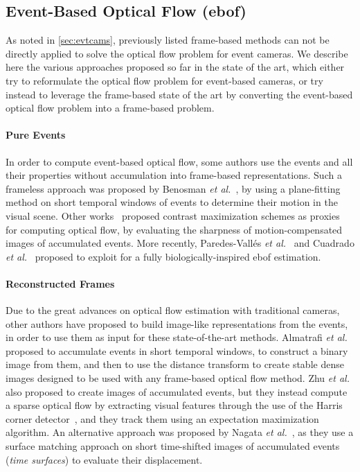 \subsection[Event-Based Optical Flow]{Event-Based Optical Flow (\acrshort{ebof})}\label{sec:ebof:sota:events}
As noted in \cref{sec:evtcams}, previously listed frame-based methods can not be directly applied to solve the optical flow problem for event cameras. We describe here the various approaches proposed so far in the state of the art, which either try to reformulate the optical flow problem for event-based cameras, or try instead to leverage the frame-based state of the art by converting the event-based optical flow problem into a frame-based problem.

\paragraph{Pure Events} In order to compute event-based optical flow, some authors use the events and all their properties without accumulation into frame-based representations. Such a frameless approach was proposed by Benosman \textit{et al.}~\cite{Benosman2014EventBasedVF}, by using a plane-fitting method on short temporal windows of events to determine their motion in the visual scene. Other works~\cite{Stoffregen2017SimultaneousOF,Gallego2018AUC,Liu2020GloballyOC,Shiba2022SecretsOE,ParedesValls2023TamingCM} proposed contrast maximization schemes as proxies for computing optical flow, by evaluating the sharpness of motion-compensated images of accumulated events. More recently, Paredes-Vallés \textit{et al.}~\cite{ParedesValls2021SelfSupervisedLO,ParedesValls2020UnsupervisedLO} and Cuadrado \textit{et al.}~\cite{Cuadrado2023OpticalFE} proposed to exploit  for a fully biologically-inspired \acrshort{ebof} estimation.

\paragraph{Reconstructed Frames} Due to the great advances on optical flow estimation with traditional cameras, other authors have proposed to build image-like representations from the events, in order to use them as input for these state-of-the-art methods. Almatrafi \textit{et al.}~\cite{Almatrafi2020DistanceSF} proposed to accumulate events in short temporal windows, to construct a binary image from them, and then to use the distance transform to create stable dense images designed to be used with any frame-based optical flow method. Zhu \textit{et al.}~\cite{Zhu2017EventbasedFT} also proposed to create images of accumulated events, but they instead compute a sparse optical flow by extracting visual features through the use of the Harris corner detector~\cite{Harris1988ACC}, and they track them using an expectation maximization algorithm. An alternative approach was proposed by Nagata \textit{et al.}~\cite{Nagata2021OpticalFE}, as they use a surface matching approach on short time-shifted images of accumulated events (\textit{time surfaces}) to evaluate their displacement.

